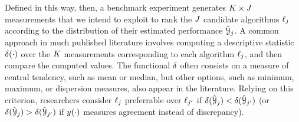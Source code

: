 
Defined in this way, then, a benchmark experiment generates
$K \times J$ measurements that we intend to exploit to rank 
the $J$ candidate algorithms $\ell_{j}$ according to the
distribution of their estimated performance $\hat{\mathcal{Y}}_{j}$.
%
A common approach in much published literature involves computing
a descriptive statistic $\delta(\cdot)$ over the $K$
measurements corresponding to each algorithm $\ell_{j}$,
and then compare the computed values.
%
The functional $\delta$ often consists on a measure of central
tendency, such as mean or median, but other options, such as
minimum, maximum, or dispersion measures, also appear in
the literature.
%
Relying on this criterion,
researchers consider $\ell_{j}$ preferrable over
$\ell_{j'}$  if
$\delta(\hat{\mathcal{Y}}_{j}) < \delta(\hat{\mathcal{Y}}_{j'})$
(or
$\delta(\hat{\mathcal{Y}}_{j}) > \delta(\hat{\mathcal{Y}}_{j'})$
if 
$y(\cdot)$ measures agreement instead of discrepancy).
%


